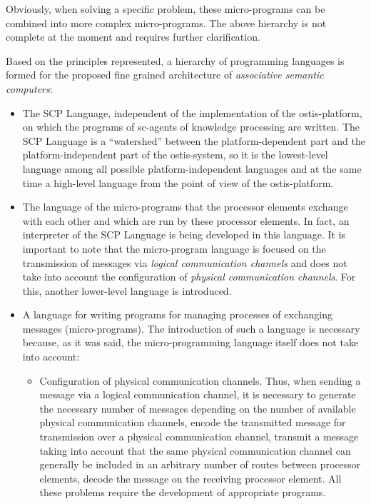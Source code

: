 \documentclass{article}
\begin{document}
\begin{multicols}{2}
	Obviously, when solving a specific problem, these micro-programs can be combined into more complex micro-programs. The above hierarchy is not complete at the moment and requires further clarification.
	
	Based on the principles represented, a hierarchy of programming languages is formed for the proposed fine grained architecture of \textit{associative semantic computers}:
	
	\begin{itemize}
		\item The SCP Language, independent of the implementation of the ostis-platform, on which the programs of sc-agents of knowledge processing are written. The SCP Language is a “watershed” between the platform-dependent part and the platform-independent part of the ostis-system, so it is the lowest-level language among all possible platform-independent languages and at the same time a high-level language from the point of view of the ostis-platform.
		
		\item The language of the micro-programs that the processor elements exchange with each other and which are run by these processor elements. In fact, an interpreter of the SCP Language is being developed in this language. It is important to note that the micro-program language is focused on the transmission of messages via \textit{logical communication channels} and does not take into account the configuration of \textit{physical communication channels}. For this, another lower-level language is introduced.
		
		\item A language for writing programs for managing processes of exchanging messages (micro-programs). The introduction of such a language is necessary because, as it was said, the micro-programming language itself does not take into account:
		
		\begin{itemize}
			\item Configuration of physical communication channels. Thus, when sending a message via a logical communication channel, it is necessary to generate the necessary number of messages depending on the number of available physical communication channels, encode the transmitted message for transmission over a physical communication channel, transmit a message taking into account that the same physical communication channel can generally be included in an arbitrary number of routes between processor elements, decode the message on the receiving processor element. All these problems require the development of 		appropriate programs.
			

\end{itemize}
\end{itemize}
\end{multicols}
\end{document}

